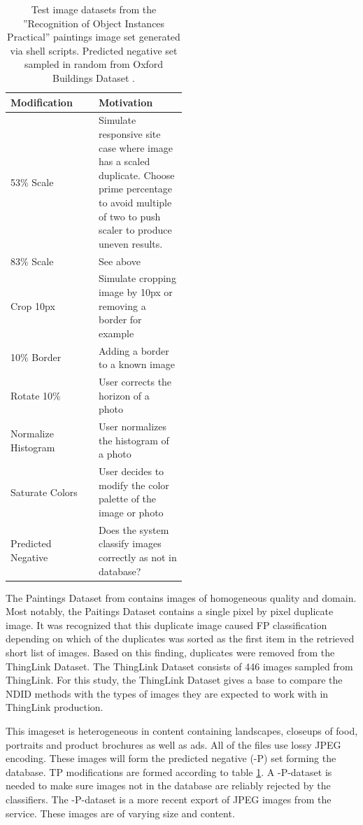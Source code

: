 \documentclass[english,12pt,a4paper,pdftex,elec,utf8, table]{aaltothesis}
\begin{document}
\def\arraystretch{1.5}
\begin{table}[htb]
\caption{Test image datasets from the ''Recognition of Object Instances Practical'' \cite{Vedaldi2012} paintings image set generated via shell scripts. Predicted negative set sampled in random from Oxford Buildings Dataset \cite{PhilbinJamesArandjelovicReljaZisserman2012}.}
\label{modifiedimages}
\begin{center}
\begin{tabular}{lp{0.5\linewidth}}
  Modification & Motivation \\
  \hline \hline
  53\% Scale& Simulate responsive site case where image has a scaled duplicate. Choose prime percentage to avoid multiple of two to push scaler to produce uneven results.\\
  \hline
  83\% Scale& See above \\
  \hline
  Crop 10px & Simulate cropping image by 10px or removing a border for example\\
  \hline
  10\% Border & Adding a border to a known image \\
  \hline
  Rotate 10\% & User corrects the horizon of a photo \\
  \hline
  Normalize Histogram & User normalizes the histogram of a photo\\
  \hline
  Saturate Colors & User decides to modify the color palette of the image or photo\\
  \hline
  Predicted Negative & Does the system classify images correctly as not in database?\\
\end{tabular}
\end{center}\end{table}

The Paintings Dataset from \cite{Vedaldi2012} contains images of homogeneous quality and domain. Most notably, the Paitings Dataset contains a single pixel by pixel duplicate image. It was recognized that this duplicate image caused FP classification depending on which of the duplicates was sorted as the first item in the retrieved short list of images. Based on this finding, duplicates were removed from the ThingLink Dataset. The ThingLink Dataset consists of 446 images sampled from ThingLink. For this study, the ThingLink Dataset gives a base to compare the NDID methods with the types of images they are expected to work with in ThingLink production.

This imageset is heterogeneous in content containing landscapes, closeups of food, portraits and product brochures as well as ads. All of the files use lossy JPEG encoding. These images will form the predicted negative (-P) set forming the database. TP modifications are formed according to table \ref{modifiedimages}. A -P-dataset is needed to make sure images not in the database are reliably rejected by the classifiers. The -P-dataset is a more recent export of JPEG images from the service. These images are of varying size and content.
\end{document}
